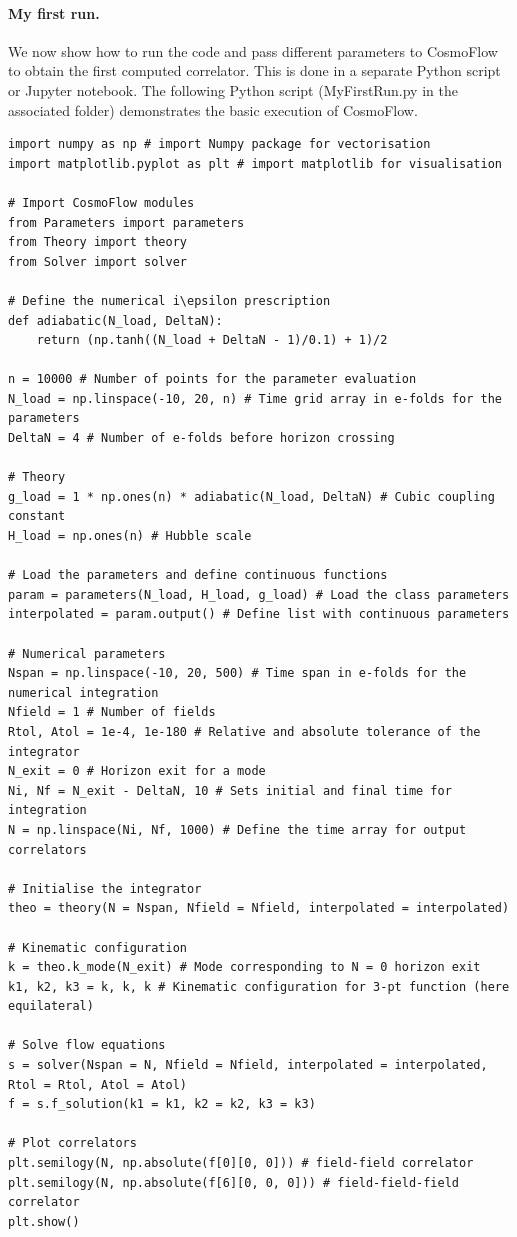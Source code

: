 \documentclass[11pt]{article}
\numberwithin{equation}{section} %
\begin{document}
\paragraph{My first run.} We now show how to run the code and pass different parameters to \textsf{CosmoFlow} to obtain the first computed correlator. This is done in a separate Python script or Jupyter notebook. The following Python script (\textsf{MyFirstRun.py} in the associated folder) demonstrates the basic execution of \textsf{CosmoFlow}. 

\begin{lstlisting}
import numpy as np # import Numpy package for vectorisation
import matplotlib.pyplot as plt # import matplotlib for visualisation

# Import CosmoFlow modules
from Parameters import parameters
from Theory import theory
from Solver import solver

# Define the numerical i\epsilon prescription
def adiabatic(N_load, DeltaN):
    return (np.tanh((N_load + DeltaN - 1)/0.1) + 1)/2

n = 10000 # Number of points for the parameter evaluation
N_load = np.linspace(-10, 20, n) # Time grid array in e-folds for the parameters
DeltaN = 4 # Number of e-folds before horizon crossing

# Theory 
g_load = 1 * np.ones(n) * adiabatic(N_load, DeltaN) # Cubic coupling constant
H_load = np.ones(n) # Hubble scale

# Load the parameters and define continuous functions
param = parameters(N_load, H_load, g_load) # Load the class parameters
interpolated = param.output() # Define list with continuous parameters

# Numerical parameters
Nspan = np.linspace(-10, 20, 500) # Time span in e-folds for the numerical integration
Nfield = 1 # Number of fields
Rtol, Atol = 1e-4, 1e-180 # Relative and absolute tolerance of the integrator
N_exit = 0 # Horizon exit for a mode
Ni, Nf = N_exit - DeltaN, 10 # Sets initial and final time for integration
N = np.linspace(Ni, Nf, 1000) # Define the time array for output correlators

# Initialise the integrator
theo = theory(N = Nspan, Nfield = Nfield, interpolated = interpolated)

# Kinematic configuration
k = theo.k_mode(N_exit) # Mode corresponding to N = 0 horizon exit
k1, k2, k3 = k, k, k # Kinematic configuration for 3-pt function (here equilateral)

# Solve flow equations
s = solver(Nspan = N, Nfield = Nfield, interpolated = interpolated, Rtol = Rtol, Atol = Atol)
f = s.f_solution(k1 = k1, k2 = k2, k3 = k3)

# Plot correlators
plt.semilogy(N, np.absolute(f[0][0, 0])) # field-field correlator
plt.semilogy(N, np.absolute(f[6][0, 0, 0])) # field-field-field correlator
plt.show()
\end{lstlisting}
\end{document}
